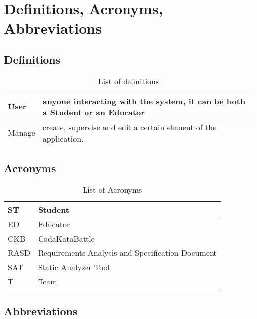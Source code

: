 \section{Definitions, Acronyms, Abbreviations}
\label{s:Definitions_Acronyms_Abbreviations}%

\subsection{Definitions}
\label{ss:Definitions}

\begin{table}[H]
  \begin{tabular}{|l|l|}

    \hline
    User & anyone interacting with the system, it can be both a Student or an Educator    \\
    \hline
    Manage & create, supervise and edit a certain element of the application. \\
    \hline
  \end{tabular}
  \caption{List of definitions}
  \label{tab:definitions}
\end{table}

\subsection{Acronyms}
\label{ss:Acronyms}

\begin{table}[H]
  \begin{tabular}{|l|l|}

    \hline
    ST & Student \\
    \hline
    ED & Educator \\
    \hline
    CKB & CodaKataBattle \\
    \hline
    RASD & Requirements Analysis and Specification Document     \\
    \hline
    SAT & Static Analyzer Tool    \\
    \hline
    T & Team    \\
    \hline
  \end{tabular}
  \caption{List of Acronyms}
  \label{tab:acronyms}
\end{table}

\subsection{Abbreviations}
\label{ss:Abbreviations}


